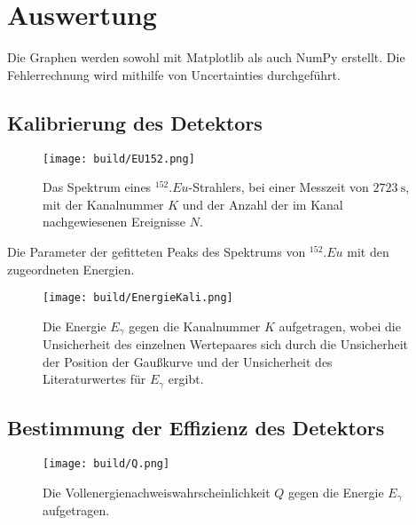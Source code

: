 \section{Auswertung}
\label{sec:Auswertung}

Die Graphen werden sowohl mit Matplotlib \cite{matplotlib} als auch NumPy \cite{numpy} erstellt. Die Fehlerrechnung wird mithilfe von Uncertainties \cite{uncertainties} durchgeführt.

\subsection{Kalibrierung des Detektors}

\begin{figure}
	\centering
	\texttt{[image: build/EU152.png]}
	\caption{Das Spektrum eines $^{152}.{Eu}$-Strahlers, bei einer Messzeit von $\SI{2723}{\second}$, mit der Kanalnummer $K$ und der Anzahl der im Kanal nachgewiesenen Ereignisse $N$.}
	\label{fig:SpektrumEu}
\end{figure}

\begin{table}
	\centering
	\caption{Die Parameter der gefitteten Peaks des Spektrums von $^{152}.{Eu}$ mit den zugeordneten Energien.}
	
	\label{tab:parameterEu}
\end{table}

\begin{figure}
	\centering
	\texttt{[image: build/EnergieKali.png]}
	\caption{Die Energie $E_\gamma$ gegen die Kanalnummer $K$ aufgetragen, wobei die Unsicherheit des einzelnen Wertepaares sich durch die Unsicherheit der Position der Gaußkurve und der Unsicherheit des Literaturwertes für $E_\gamma$ ergibt.}
	\label{fig:Kalibrierungi}
\end{figure}

\subsection{Bestimmung der Effizienz des Detektors}

\begin{figure}
	\centering
	\texttt{[image: build/Q.png]}
	\caption{Die Vollenergienachweiswahrscheinlichkeit $Q$ gegen die Energie $E_\gamma$ aufgetragen.}
	\label{fig:Q}
\end{figure}

